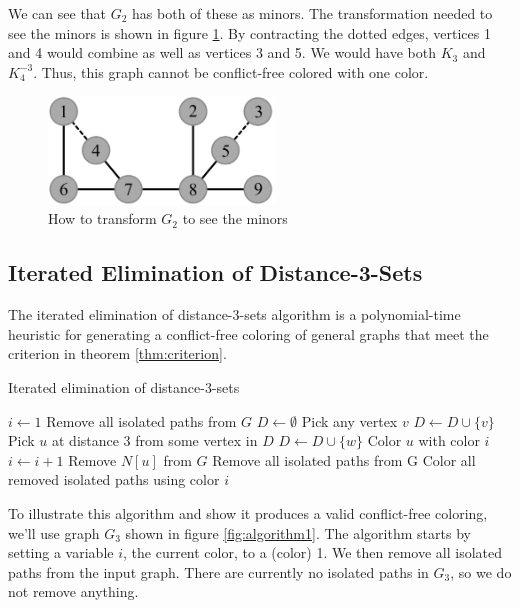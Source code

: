 \documentclass{sig-alternate}
\begin{document}
We can see that $G_2$ has both of these as minors. The transformation needed to see the minors is shown in figure \ref{fig:criterion-minor}. By contracting the dotted edges, vertices 1 and 4 would combine as well as vertices 3 and 5. We would have both $K_{3}$ and $K_{4}^{-3}$. Thus, this graph cannot be conflict-free colored with one color.

\begin{figure}[h]
	\centering
	\includegraphics[width=6cm]{../figures/criterion-minor.pdf}
	\caption{How to transform $G_2$ to see the minors}\label{fig:criterion-minor}
\end{figure}

\subsection{Iterated Elimination of Distance-3-Sets}
The iterated elimination of distance-3-sets algorithm is a polynomial-time heuristic for generating a conflict-free coloring of general graphs that meet the criterion in theorem \ref{thm:criterion}.

\begin{algorithm}
\caption{Iterated elimination of distance-3-sets} \label{alg:elimination}
\begin{algorithmic}[1]
\State $i \gets 1$
\State Remove all isolated paths from $G$
	\State $D \gets \emptyset$
		\State Pick any vertex $v$
		\State $D \gets D \cup \{ v \}$
			\State Pick $u$ at distance 3 from some vertex in $D$
			\State $D \gets D \cup \{ w \}$
		\EndWhile
			\State Color $u$ with color $i$
		\EndFor
		\State $i \gets i + 1$
			\State Remove $N[u]$ from $G$
		\EndFor
		\State Remove all isolated paths from G
	\EndFor
\EndWhile
\State Color all removed isolated paths using color $i$
\end{algorithmic}
\end{algorithm}

To illustrate this algorithm and show it produces a valid conflict-free coloring, we'll use graph $G_3$ shown in figure \ref{fig:algorithm1}. The algorithm starts by setting a variable $i$, the current color, to a (color) 1. We then remove all isolated paths from the input graph. There are currently no isolated paths in $G_3$, so we do not remove anything.
\end{document}
